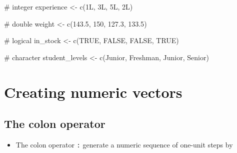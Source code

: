 \documentclass[
  letterpaper,
  DIV=11,
  numbers=noendperiod]{scrreprt}
\newenvironment{Shaded}{\begin{snugshade}}{\end{snugshade}}
\newcommand{\CommentTok}[1]{\textcolor[rgb]{0.37,0.37,0.37}{#1}}
\newcommand{\ConstantTok}[1]{\textcolor[rgb]{0.56,0.35,0.01}{#1}}
\newcommand{\DecValTok}[1]{\textcolor[rgb]{0.68,0.00,0.00}{#1}}
\newcommand{\FloatTok}[1]{\textcolor[rgb]{0.68,0.00,0.00}{#1}}
\newcommand{\FunctionTok}[1]{\textcolor[rgb]{0.28,0.35,0.67}{#1}}
\newcommand{\NormalTok}[1]{\textcolor[rgb]{0.00,0.23,0.31}{#1}}
\newcommand{\OtherTok}[1]{\textcolor[rgb]{0.00,0.23,0.31}{#1}}
\newcommand{\StringTok}[1]{\textcolor[rgb]{0.13,0.47,0.30}{#1}}
\providecommand{\tightlist}{%
  \setlength{\itemsep}{0pt}\setlength{\parskip}{0pt}}\usepackage{longtable,booktabs,array}
\begin{document}
\begin{tcolorbox}[enhanced jigsaw, colbacktitle=quarto-callout-tip-color!10!white, opacitybacktitle=0.6, breakable, left=2mm, leftrule=.75mm, toprule=.15mm, toptitle=1mm, bottomtitle=1mm, colframe=quarto-callout-tip-color-frame, opacityback=0, coltitle=black, arc=.35mm, titlerule=0mm, colback=white, bottomrule=.15mm, title=\textcolor{quarto-callout-tip-color}{\faLightbulb}\hspace{0.5em}{Answer}, rightrule=.15mm]

\begin{Shaded}
\begin{Highlighting}[]
\CommentTok{\# integer}
\NormalTok{experience }\OtherTok{\textless{}{-}} \FunctionTok{c}\NormalTok{(}\DecValTok{1}\NormalTok{L, }\DecValTok{3}\NormalTok{L, }\DecValTok{5}\NormalTok{L, }\DecValTok{2}\NormalTok{L)}

\CommentTok{\# double}
\NormalTok{weight }\OtherTok{\textless{}{-}} \FunctionTok{c}\NormalTok{(}\FloatTok{143.5}\NormalTok{, }\DecValTok{150}\NormalTok{, }\FloatTok{127.3}\NormalTok{, }\FloatTok{133.5}\NormalTok{)}

\CommentTok{\# logical}
\NormalTok{in\_stock }\OtherTok{\textless{}{-}} \FunctionTok{c}\NormalTok{(}\ConstantTok{TRUE}\NormalTok{, }\ConstantTok{FALSE}\NormalTok{, }\ConstantTok{FALSE}\NormalTok{, }\ConstantTok{TRUE}\NormalTok{)}

\CommentTok{\# character}
\NormalTok{student\_levels }\OtherTok{\textless{}{-}} \FunctionTok{c}\NormalTok{(}\StringTok{\textquotesingle{}Junior\textquotesingle{}}\NormalTok{, }\StringTok{\textquotesingle{}Freshman\textquotesingle{}}\NormalTok{, }\StringTok{\textquotesingle{}Junior\textquotesingle{}}\NormalTok{, }\StringTok{\textquotesingle{}Senior\textquotesingle{}}\NormalTok{)}
\end{Highlighting}
\end{Shaded}

\end{tcolorbox}

\section{Creating numeric vectors}\label{creating-numeric-vectors}

\subsection{The colon operator}\label{the-colon-operator}

\begin{itemize}
\tightlist
\item
  The colon operator \texttt{:} generate a numeric sequence of one-unit
  steps by
\end{itemize}
\end{document}
